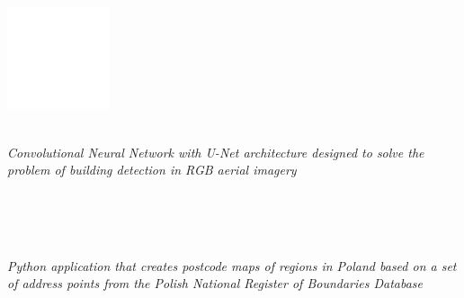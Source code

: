 \documentclass{cls/gml_cv_sets}
\begin{document}
\begin{paracol}{2}

\paracolbackgroundoptions
\footnotesize

{\setasidefontcolour

\vspace{-1em}

\begin{center}
    \includegraphics[height=3cm]{imgs/qr_code.png} \\
\end{center}
\vspace{-1em}

{\small

 \\

\textit{\footnotesize Convolutional Neural Network with U-Net architecture 
designed to solve the problem of building detection in RGB aerial 
imagery} \\ \vspace{-0.75em}

 \\

 \\ \vspace{0.6em}

 \\ 

\textit{\footnotesize Python application that creates postcode maps of regions
 in Poland based on a set of address points from the Polish National Register 
 of Boundaries Database} \\ \vspace{-0.75em}

}}
\end{paracol}
\end{document}
